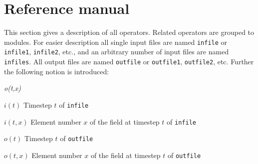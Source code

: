 \chapter{\label{refman}Reference manual}

This section gives a description of all operators. Related operators are grouped to modules.
For easier description all single input files are named \texttt{infile} or \texttt{infile1}, \texttt{infile2}, etc.,
and an arbitrary number of input files are named \texttt{infiles}.
All output files are named \texttt{outfile} or \texttt{outfile1}, \texttt{outfile2}, etc.
Further the following notion is introduced:
\begin{defalist}{{\em o(t,x)}}
\item[\(i(t)\)\hfill]
Timestep \(t\) of \texttt{infile}
\item[\(i(t,x)\)\hfill]
Element number \(x\) of the field at timestep \(t\) of \texttt{infile}
\item[\(o(t)\)\hfill]
Timestep \(t\) of \texttt{outfile}
\item[\(o(t,x)\)\hfill]
Element number \(x\) of the field at timestep \(t\) of \texttt{outfile}
\end{defalist}




